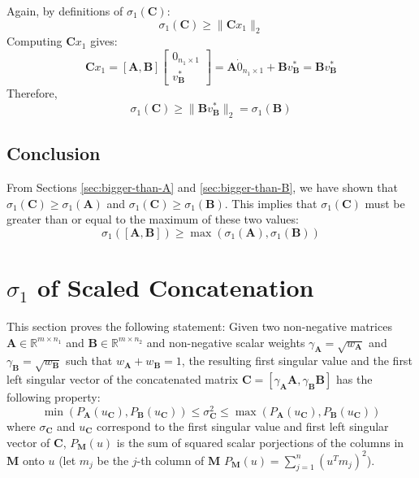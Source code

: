 Again, by definitions of $\sigma_1(\mathbf{C})$:
\[ \sigma_1(\mathbf{C}) \geq \parallel \mathbf{C}x_1 \parallel_2 \]
Computing $\mathbf{C}x_1$ gives:
\[ \mathbf{C}x_1 = [\mathbf{A}, \mathbf{B}] \begin{bmatrix} 0_{n_1 \times 1} \\
v_{\mathbf{B}}^* \end{bmatrix} = \mathbf{A} \dot 0_{n_1 \times 1} + \mathbf{B}
v_{\mathbf{B}}^* = \mathbf{B}v_{\mathbf{B}}^* \]
Therefore,
\[ \sigma_1(\mathbf{C}) \geq \parallel \mathbf{B}v_{\mathbf{B}}^* \parallel_2 =
\sigma_1(\mathbf{B})\]

\subsection{Conclusion}
From Sections \ref{sec:bigger-than-A} and \ref{sec:bigger-than-B}, we have shown
that $\sigma_1(\mathbf{C}) \geq \sigma_1(\mathbf{A})$ and $\sigma_1(\mathbf{C})
\geq \sigma_1(\mathbf{B})$. This implies that $\sigma_1(\mathbf{C})$ must be
greater than or equal to the maximum of these two values:
\[ \sigma_1([\mathbf{A}, \mathbf{B}]) \geq \max(\sigma_1(\mathbf{A}),
\sigma_1(\mathbf{B})) \]

\section{$\sigma_1$ of Scaled Concatenation}
This section proves the following statement:
Given two non-negative matrices $\mathbf{A} \in \mathbb{R}^{m \times n_1}$ and
$\mathbf{B} \in \mathbb{R}^{m \times n_2}$ and non-negative scalar weights
$\gamma_{\mathbf{A}} = \sqrt{w_{\mathbf{A}}}$ and $\gamma_{\mathbf{B}} =
\sqrt{w_{\mathbf{B}}}$ such that $w_{\mathbf{A}} + w_{\mathbf{B}} = 1$, the
resulting first singular value and the first left
singular vector of the concatenated matrix $\mathbf{C} = [\gamma_{\mathbf{A}}\mathbf{A},
\gamma_{\mathbf{B}}\mathbf{B}]$ has the following property:
\[ \min(P_{\mathbf{A}}(u_{\mathbf{C}}),P_{\mathbf{B}}(u_{\mathbf{C}})) \leq \sigma_{\mathbf{C}}^2 \leq
\max(P_{\mathbf{A}}(u_{\mathbf{C}}),P_{\mathbf{B}}(u_{\mathbf{C}})) \]
where $\sigma_{\mathbf{C}}$ and $u_{\mathbf{C}}$ correspond to the first singular value and first
left singular vector of $\mathbf{C}$, $P_{\mathbf{M}}(u)$ is the sum of squared scalar porjections
of the columns in $\mathbf{M}$ onto $u$ (let $m_j$ be the $j$-th column of $\mathbf{M}$ $P_{\mathbf{M}}(u)
= \sum_{j=1}^n (u^T m_j)^2$).

